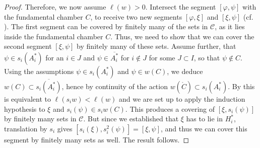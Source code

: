 \begin{proof}
    Therefore, we now assume \(\ell(w) > 0\).
    Intersect the segment \([\varphi, \psi]\) with the fundamental chamber \(C\), to receive two new segments \([\varphi, \xi]\) and \([\xi, \psi]\) (cf. ).
    The first segment can be covered by finitely many of the sets in \(\mathcal{C}\), as it lies inside the fundamental chamber \(C\).
    Thus, we need to show that we can cover the second segment \([\xi, \psi]\) by finitely many of these sets.
    Assume further, that \(\psi\in s_i(A_i^*)\) for an \(i\in J\) and \(\psi\in\overline{A_i^*}\) for \(i\notin J\) for some \(J\subset I\), so that \(\psi\notin C\).
    Using the assumptions \(\psi\in s_i(A_i^*)\) and \(\psi\in w(C)\), we deduce \(w(C)\subset \overline{s_i(A_i^*)}\), hence by continuity of the action \(w(\mathring{C})\subset s_i(A_i^*)\).
    By  this is equivalent to \(\ell(s_iw) < \ell(w)\) and we are set up to apply the induction hypothesis to \(\xi\) and \(s_i(\psi)\in s_iw(C)\).
    This produces a covering of \([\xi,s_i(\psi)]\) by finitely many sets in \(\mathcal{C}\).
    But since we established that \(\xi\) has to lie in \(H_i^*\), translation by \(s_i\) gives \([s_i(\xi), s_i^2(\psi)] = [\xi, \psi]\), and thus we can cover this segment by finitely many sets as well.
    The result follows.
\end{proof}

